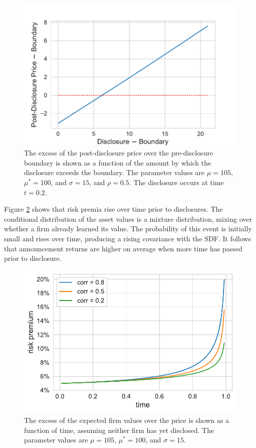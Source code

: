 \documentclass[authoryear,letterpaper,english,12pt]{elsarticle}
\begin{document}
\begin{figure}[htp]\caption{The excess of the post-disclosure price over the pre-disclosure boundary is shown as a function of the amount by which the disclosure exceeds the boundary.  The parameter values are $\mu=105$, $\mu^*=100$, and $\sigma=15$, and $\rho=0.5$.  The disclosure occurs at time $t=0.2$.\label{fig1}}
\begin{center}
    \includegraphics[scale=0.8]{Figures/DisclosurePostDisclosure.pdf}
\end{center}
\end{figure}

Figure \ref{fig2} shows that risk premia rise over time prior to disclosures.  The conditional distribution of the asset values is a mixture distribution, mixing over whether a firm already learned its value.  The probability of this event is initially small and rises over time, producing a rising covariance with the SDF.  It follows that announcement returns are higher on average when more time has passed prior to disclosure.

\begin{figure}[htp]\caption{The excess of the expected firm values over the price is shown as a function of time, assuming neither firm has yet disclosed.    The parameter values are $\mu=105$, $\mu^*=100$, and $\sigma=15$.\label{fig2}}
\begin{center}
    \includegraphics[scale=0.8]{Figures/RiskPremia.pdf}
\end{center}
\end{figure}
\end{document}
